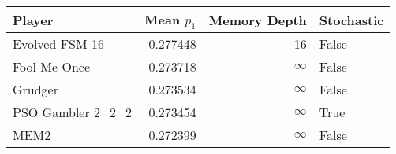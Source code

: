 \begin{tabular}{lrrl}
\toprule
            Player &  Mean $p_1$ &  Memory Depth & Stochastic \\
\midrule
    Evolved FSM 16 &    0.277448 &            16 &      False \\
      Fool Me Once &    0.273718 &            \(\infty\) &      False \\
           Grudger &    0.273534 &            \(\infty\) &      False \\
 PSO Gambler 2\_2\_2 &    0.273454 &            \(\infty\) &       True \\
              MEM2 &    0.272399 &            \(\infty\) &      False \\
\bottomrule
\end{tabular}
